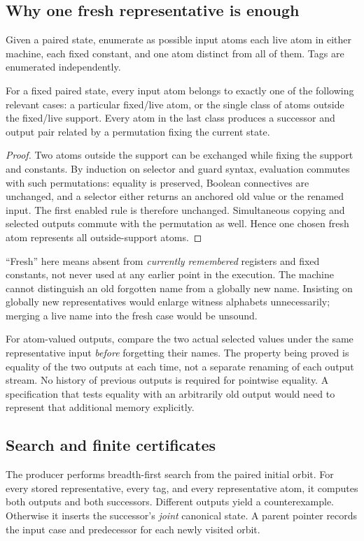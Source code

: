\subsection{Why one fresh representative is enough}
Given a paired state, enumerate as possible input atoms each live atom in either
machine, each fixed constant, and one atom distinct from all of them. Tags are
enumerated independently.

\begin{lemma}
\label{lem:freshinput}
For a fixed paired state, every input atom belongs to exactly one of the
following relevant cases: a particular fixed/live atom, or the single class of
atoms outside the fixed/live support. Every atom in the last class produces a
successor and output pair related by a permutation fixing the current state.
\end{lemma}
\begin{proof}
Two atoms outside the support can be exchanged while fixing the support and
constants. By induction on selector and guard syntax, evaluation commutes with
such permutations: equality is preserved, Boolean connectives are unchanged,
and a selector either returns an anchored old value or the renamed input.
The first enabled rule is therefore unchanged. Simultaneous copying and
selected outputs commute with the permutation as well. Hence one chosen fresh
atom represents all outside-support atoms.
\end{proof}

``Fresh'' here means absent from \emph{currently remembered} registers and fixed
constants, not never used at any earlier point in the execution. The machine
cannot distinguish an old forgotten name from a globally new name. Insisting
on globally new representatives would enlarge witness alphabets unnecessarily;
merging a live name into the fresh case would be unsound.

For atom-valued outputs, compare the two actual selected values under the same
representative input \emph{before} forgetting their names. The property being
proved is equality of the two outputs at each time, not a separate renaming of
each output stream. No history of previous outputs is required for pointwise
equality. A specification that tests equality with an arbitrarily old output
would need to represent that additional memory explicitly.

\subsection{Search and finite certificates}
The producer performs breadth-first search from the paired initial orbit.
For every stored representative, every tag, and every representative atom,
it computes both outputs and both successors. Different outputs yield a
counterexample. Otherwise it inserts the successor's \emph{joint} canonical
state. A parent pointer records the input case and predecessor for each newly
visited orbit.

